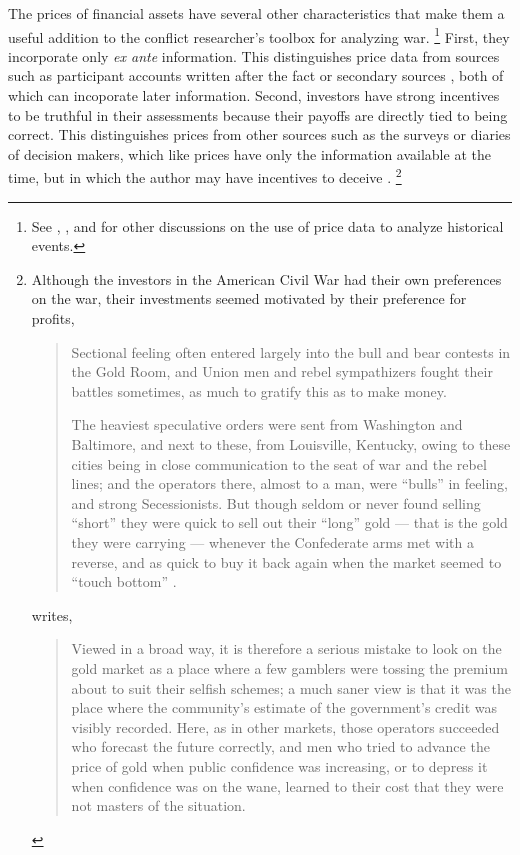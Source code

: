 The prices of financial assets have several other characteristics that make them a useful addition to the conflict researcher's toolbox for analyzing war.
\footnote{See \textcite{WillardGuinnaneEtAl1996}, \textcite{north2000introd}, and \textcite{FreyKucher2000} for other  discussions on the use of price data to analyze historical events.} %
First, they incorporate only \textit{ex ante} information.
This distinguishes price data from sources such as participant accounts written after the fact or secondary sources \parencites[1001]{WillardGuinnaneEtAl1996}[][188]{FreyKucher2000a}, both of which can incoporate later information.
Second, investors have strong incentives to be truthful in their assessments because their payoffs are directly tied to being correct.
This distinguishes prices from other sources such as the surveys or diaries of decision makers, which like prices have only the information available at the time, but in which the author may have incentives to deceive \parencite[57]{Reiter2009}.%
\footnote{
  Although the investors in the American Civil War had their own preferences on the war, their investments seemed motivated by their preference for profits,
  \begin{quote}
    Sectional feeling often entered largely into the bull and bear  contests in the Gold Room, and Union men and rebel sympathizers fought their battles sometimes, as much to gratify this as to make money.
    \textcite[7]{Cornwallis1879}
    
    The heaviest speculative orders were sent from Washington and Baltimore, and next to these, from Louisville, Kentucky, owing to these cities being in close communication to the seat of war and the rebel lines; and the operators there, almost to a man, were ``bulls'' in feeling, and strong Secessionists.
    But though seldom or never found selling ``short'' they were quick to sell out their ``long'' gold --- that is the gold they were carrying --- whenever the Confederate arms met with a reverse, and as quick to buy it back again when the market seemed to ``touch bottom'' \textcite[5]{Cornwallis1879}.
  \end{quote}
  \textcite[210]{Mitchell1903} writes,
  \begin{quote}
    Viewed in a broad way, it is therefore a serious mistake to look on the gold market as a place where a few gamblers were tossing the premium about to suit their selfish schemes; a much saner view is that it was the place where the community's estimate of the government's credit was visibly recorded.
    Here, as in other markets, those operators succeeded who forecast the future correctly, and men who tried to advance the price of gold when public confidence was increasing, or to depress it when confidence was on the wane, learned to their cost that they were not masters of the situation.
  \end{quote}
} %

